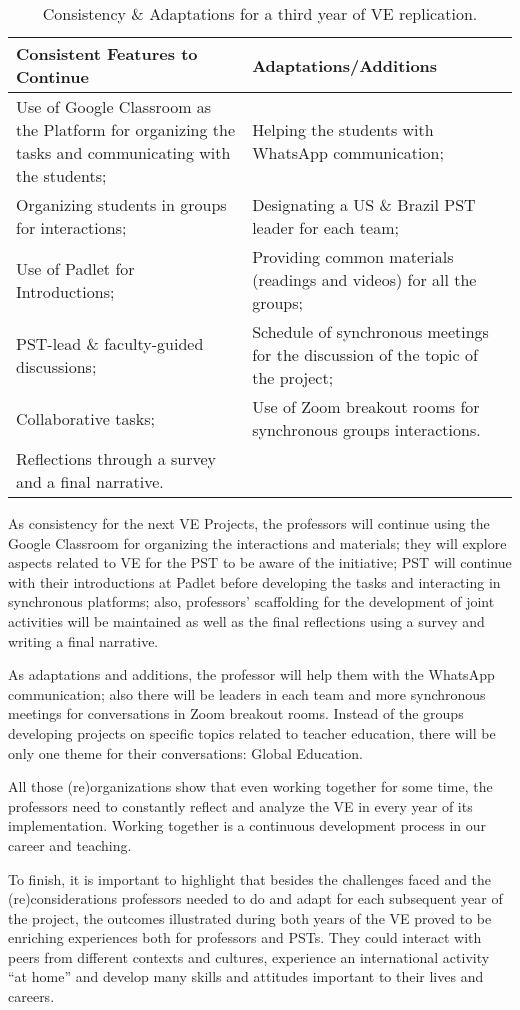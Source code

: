 \begin{table}[htpb]
\centering
\small
\setlength{\tabcolsep}{3pt}
\begin{threeparttable}
\caption{Consistency \& Adaptations for a third year of VE replication.}
\label{tab-03}
\begin{tabular}{*{2}{p{}}}
\toprule
Consistent Features to Continue & Adaptations/Additions \\
\midrule
Use of Google Classroom as the Platform for organizing the tasks and communicating with the students; & Helping the students with WhatsApp communication; \\ Organizing students in groups for interactions; & Designating a US \& Brazil PST leader for each team;\\
Use of Padlet for Introductions; & Providing common materials (readings and videos) for all the groups;\\ 
PST-lead \& faculty-guided discussions; & Schedule of synchronous meetings  for the discussion of the topic of the project;\\
Collaborative tasks; & Use of Zoom breakout rooms for synchronous groups interactions.\\
Reflections through a survey and a final narrative. & \\
\bottomrule		
\end{tabular}
\end{threeparttable}
\end{table}
	
As consistency for the next VE Projects, the professors will continue
using the Google Classroom for organizing the interactions and
materials; they will explore aspects related to VE for the PST to be
aware of the initiative; PST will continue with their introductions at
Padlet before developing the tasks and interacting in synchronous
platforms; also, professors' scaffolding for the development of joint
activities will be maintained as well as the final reflections using a
survey and writing a final narrative.
		
As adaptations and additions, the professor will help them with the
WhatsApp communication; also there will be leaders in each team and more
synchronous meetings for conversations in Zoom breakout rooms. Instead
of the groups developing projects on specific topics related to teacher
education, there will be only one theme for their conversations: Global
Education.
		
All those (re)organizations show that even working together for some
time, the professors need to constantly reflect and analyze the VE in
every year of its implementation. Working together is a continuous
development process in our career and teaching.
		
To finish, it is important to highlight that besides the challenges
faced and the (re)considerations professors needed to do and adapt for
each subsequent year of the project, the outcomes illustrated during
both years of the VE proved to be enriching experiences both for
professors and PSTs. They could interact with peers from different
contexts and cultures, experience an international activity \enquote{at home}
and develop many skills and attitudes important to their lives and
careers.

